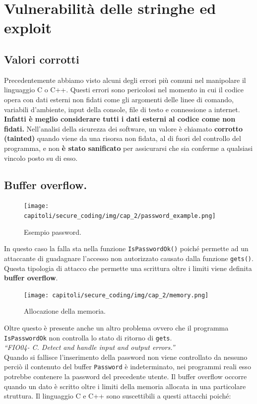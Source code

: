 \section{Vulnerabilità delle stringhe ed exploit}

\subsection{Valori corrotti}

Precedentemente abbiamo visto alcuni degli errori più comuni nel manipolare il
linguaggio C o C++. Questi errori sono pericolosi nel momento in cui il codice opera
con dati esterni non fidati come gli argomenti delle linee di comando, variabili
d'ambiente, input della console, file di testo e connessione a internet.
\textbf{Infatti è meglio considerare tutti i dati esterni al codice come non fidati. }
Nell'analisi della sicurezza dei software, un valore è
chiamato \textbf{corrotto (tainted)} quando viene da una risorsa non fidata, al di
fuori del controllo del programma, e non \textbf{è stato sanificato} per assicurarsi
che sia conferme a qualsiasi vincolo posto su di esso.

\subsection{Buffer overflow.}

\begin{figure}[H]
    \centering
    \texttt{[image: capitoli/secure\_coding/img/cap\_2/password\_example.png]}
    \caption{Esempio password.}\label{fig:password}
\end{figure}

In questo caso la falla sta nella funzione \verb|IsPasswordOk()| poiché permette ad
un attaccante di guadagnare l'accesso non autorizzato causato dalla
funzione \verb|gets()|. Questa tipologia di attacco che permette una scrittura oltre
i limiti viene definita \textbf{buffer overflow}.

\begin{figure}[H]
    \centering
    \texttt{[image: capitoli/secure\_coding/img/cap\_2/memory.png]}
    \caption{Allocazione della memoria.}\label{fig:memoria}
\end{figure}

Oltre questo è presente anche un altro problema ovvero che il
programma \verb|IsPasswordOk| non controlla lo stato di ritorno di \verb|gets|. \\
\textit{“FIO04- C. Detect and handle input and output errors.”}\\
Quando si fallisce l'inserimento della password non viene controllato da nessuno
perciò il contenuto del buffer \verb|Password| è indeterminato, nei programmi reali
esso potrebbe contenere la password del precedente utente.
Il buffer overflow occorre quando un dato è scritto oltre i limiti della memoria
allocata in una particolare struttura. Il linguaggio C e C++ sono
suscettibili a questi attacchi poiché:

